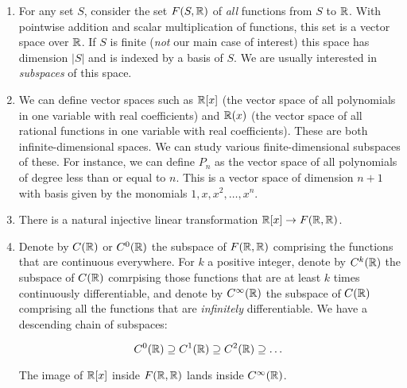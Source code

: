 \documentclass[10pt]{amsart}
\begin{document}
\begin{enumerate}
\item For any set $S$, consider the set $F(S,\mathbb{R})$ of {\em all}
  functions from $S$ to $\mathbb{R}$. With pointwise addition and scalar
  multiplication of functions, this set is a vector space over
  $\mathbb{R}$. If $S$ is finite ({\em not} our main case of interest) this
  space has dimension $|S|$ and is indexed by a basis of $S$. We are
  usually interested in {\em subspaces} of this space.
\item We can define vector spaces such as $\mathbb{R}[x]$ (the vector space of
  all polynomials in one variable with real coefficients) and $\mathbb{R}(x)$
  (the vector space of all rational functions in one variable with
  real coefficients). These are both infinite-dimensional spaces. We
  can study various finite-dimensional subspaces of these. For
  instance, we can define $P_n$ as the vector space of all polynomials
  of degree less than or equal to $n$. This is a vector space of
  dimension $n + 1$ with basis given by the monomials
  $1,x,x^2,\dots,x^n$.
\item There is a natural injective linear transformation $\mathbb{R}[x] \to
  F(\mathbb{R},\mathbb{R})$.
\item Denote by $C(\mathbb{R})$ or $C^0(\mathbb{R})$ the subspace of $F(\mathbb{R},\mathbb{R})$
  comprising the functions that are continuous everywhere. For $k$ a
  positive integer, denote by $C^k(\mathbb{R})$ the subspace of $C(\mathbb{R})$
  comrpising those functions that are at least $k$ times continuously
  differentiable, and denote by $C^\infty(\mathbb{R})$ the subspace of $C(\mathbb{R})$
  comprising all the functions that are {\em infinitely}
  differentiable. We have a descending chain of subspaces:

  $$C^0(\mathbb{R}) \supseteq C^1(\mathbb{R}) \supseteq C^2(\mathbb{R}) \supseteq \dots $$

  The image of $\mathbb{R}[x]$ inside $F(\mathbb{R},\mathbb{R})$ lands inside $C^\infty(\mathbb{R})$.


\end{enumerate}
\end{document}
